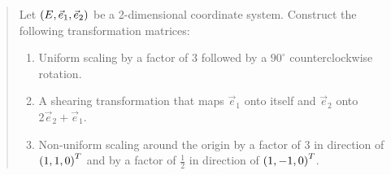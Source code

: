 \documentclass[english]{exercise}
\begin{document}
	\begin{quote}
		Let \(\parentheses*{E, \vec{e}_1, \vec{e}_2}\) be a 2-dimensional coordinate system.
		Construct the following transformation matrices:
		\begin{enumerate}
			\item Uniform scaling by a factor of \(3\) followed by a \(90^\circ\) counterclockwise rotation.
			\item A shearing transformation that maps \(\vec{e}_1\) onto itself and \(\vec{e}_2\) onto \(2\vec{e}_2 + \vec{e}_1\).
			\item Non-uniform scaling around the origin by a factor of \(3\) in direction of \(\parentheses*{1, 1, 0}^T\) and by a factor of \(\frac{1}{2}\) in direction of \(\parentheses*{1, -1, 0}^T\).
		\end{enumerate}
	\end{quote}
\end{document}

